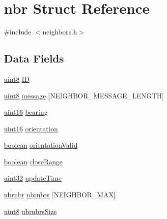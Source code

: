 \hypertarget{structnbr}{
\section{nbr Struct Reference}
\label{structnbr}
}


{\ttfamily \#include $<$neighbors.h$>$}

\subsection*{Data Fields}
\begin{DoxyCompactItemize}
\item 
\hyperlink{typedefs_8h_adde6aaee8457bee49c2a92621fe22b79}{uint8} \hyperlink{structnbr_a91116d848e5fd7311aab72a19640fd33}{ID}
\item 
\hyperlink{typedefs_8h_adde6aaee8457bee49c2a92621fe22b79}{uint8} \hyperlink{structnbr_a11a5527cffa99f3eb060b4efd4cc26e8}{message} \mbox{[}NEIGHBOR\_\-MESSAGE\_\-LENGTH\mbox{]}
\item 
\hyperlink{typedefs_8h_a4a2b22a29dec0305e3f9cbc69d0ff414}{uint16} \hyperlink{structnbr_afea3a6ad44a6e5c5f0d45a4f19942831}{bearing}
\item 
\hyperlink{typedefs_8h_a4a2b22a29dec0305e3f9cbc69d0ff414}{uint16} \hyperlink{structnbr_a4939850ec42f8949427cb6dd0cf688d9}{orientation}
\item 
\hyperlink{typedefs_8h_a7670a4e8a07d9ebb00411948b0bbf86d}{boolean} \hyperlink{structnbr_a16b5e05a30261351b0283ecb54fa3ef2}{orientationValid}
\item 
\hyperlink{typedefs_8h_a7670a4e8a07d9ebb00411948b0bbf86d}{boolean} \hyperlink{structnbr_ad87189c876732d9eef4643a13fb4e5bd}{closeRange}
\item 
\hyperlink{typedefs_8h_a4b435a49c74bb91f284f075e63416cb6}{uint32} \hyperlink{structnbr_a96e15d768d6d2dd96cbcbd7b91d359c2}{updateTime}
\item 
\hyperlink{structnbrnbr}{nbrnbr} \hyperlink{structnbr_a20de230398a34fcd2958fa26884f4d67}{nbrnbrs} \mbox{[}NEIGHBOR\_\-MAX\mbox{]}
\item 
\hyperlink{typedefs_8h_adde6aaee8457bee49c2a92621fe22b79}{uint8} \hyperlink{structnbr_a6c7ea3d28f851ec31c8e0e3701a1a881}{nbrnbrsSize}
\end{DoxyCompactItemize}


